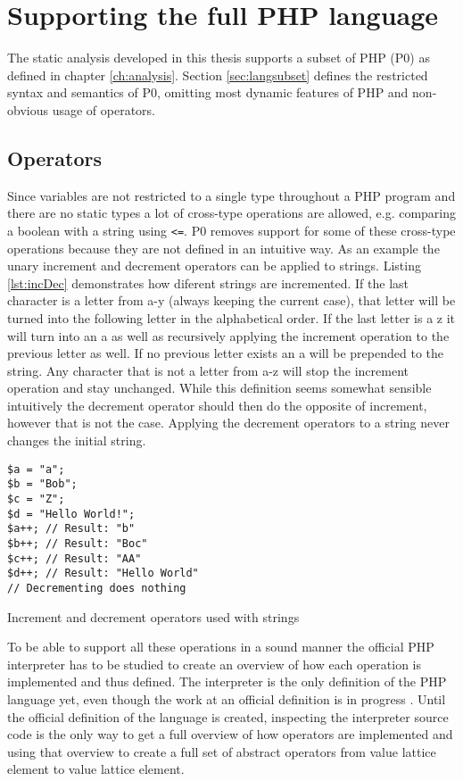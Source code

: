 \section{Supporting the full PHP language}
\label{sec:future1}
The static analysis developed in this thesis supports a subset of PHP (P0) as defined in chapter \ref{ch:analysis}. Section \ref{sec:langsubset} defines the restricted syntax and semantics of P0, omitting most dynamic features of PHP and non-obvious usage of operators. 

\subsection{Operators}
Since variables are not restricted to a single type throughout a PHP program and there are no static types a lot of cross-type operations are allowed, e.g. comparing a boolean with a string using \texttt{<=}. P0 removes support for some of these cross-type operations because they are not defined in an intuitive way. As an example the unary increment and decrement operators can be applied to strings. Listing \ref{lst:incDec} demonstrates how diferent strings are incremented. If the last character is a letter from a-y (always keeping the current case), that letter will be turned into the following letter in the alphabetical order. If the last letter is a z it will turn into an a as well as recursively applying the increment operation to the previous letter as well. If no previous letter exists an a will be prepended to the string. Any character that is not a letter from a-z will stop the increment operation and stay unchanged. While this definition seems somewhat sensible intuitively the decrement operator should then do the opposite of increment, however that is not the case. Applying the decrement operators to a string never changes the initial string.

\begin{program}
\begin{lstlisting}
$a = "a";
$b = "Bob";
$c = "Z";
$d = "Hello World!";
$a++; // Result: "b"
$b++; // Result: "Boc"
$c++; // Result: "AA"
$d++; // Result: "Hello World"
// Decrementing does nothing
\end{lstlisting}
\caption{Increment and decrement operators used with strings}
\label{lst:incDec}
\end{program}

To be able to support all these operations in a sound manner the official PHP interpreter has to be studied to create an overview of how each operation is implemented and thus defined. The interpreter is the only definition of the PHP language yet, even though the work at an official definition is in progress . Until the official definition of the language is created, inspecting the interpreter source code is the only way to get a full overview of how operators are implemented and using that overview to create a full set of abstract operators from value lattice element to value lattice element.



